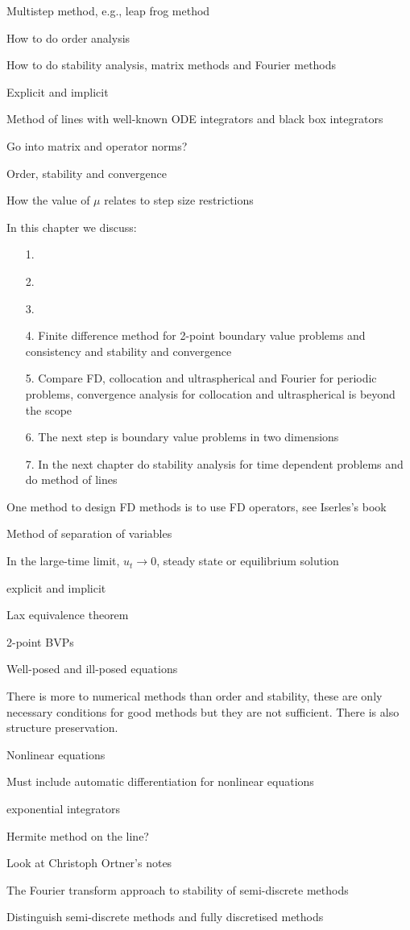 \documentclass[12pt,a4paper]{article}
\begin{document}
Multistep method, e.g., leap frog method

How to do order analysis

How to do stability analysis, matrix methods and Fourier methods

Explicit and implicit

Method of lines with well-known ODE integrators and black box integrators

Go into matrix and operator norms?

Order, stability and convergence

How the value of $\mu$ relates to step size restrictions

In this chapter we discuss:

\begin{itemize}
\item[1. ] 
\item[2. ] 
\item[3. ] 
\item[4. ] Finite difference method for 2-point boundary value problems and consistency and stability and convergence


\item[5. ] Compare FD, collocation and ultraspherical and Fourier for periodic problems, convergence analysis for collocation and ultraspherical is beyond the scope 


\item[6. ] The next step is boundary value problems in two dimensions


\item[7. ] In the next chapter do stability analysis for time dependent problems and do method of lines

\end{itemize}
One method to design FD methods is to use FD operators, see Iserles's book

Method of separation of variables

In the large-time limit, $u_t \to 0$, steady state or equilibrium solution

explicit and implicit

Lax equivalence theorem

2-point BVPs

Well-posed and ill-posed equations

There is more to numerical methods than order and stability, these are only necessary conditions for good methods but they are not sufficient.  There is also structure preservation.

Nonlinear equations

Must include automatic differentiation for nonlinear equations

exponential integrators

Hermite method on the line?

Look at Christoph Ortner's notes

The Fourier transform approach to stability of semi-discrete methods

Distinguish semi-discrete methods and fully discretised methods


\begin{lstlisting}

\end{lstlisting}
\end{document}
